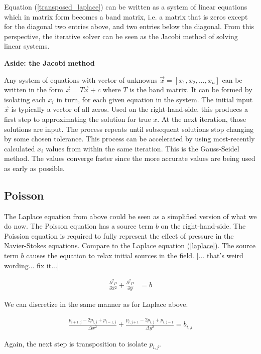 \documentclass[11pt]{article}
\begin{document}
{Equation (\ref{transposed_laplace}) can be written as a system of linear equations which in
matrix form becomes a band matrix, i.e. a matrix that is zeros except for the diagonal
two entries above, and two entries below the diagonal. From this perspective, the iterative
solver can be seen as the Jacobi method of solving linear systems.

\textbf{Aside: the Jacobi method}

Any system of equations with vector of unknowns $\vec{x} = [x_1, x_2,... ,x_n]$ can be written
in the form $\vec{x} = T\vec{x} + c$ where $T$ is the band matrix. It can be formed by
isolating each $x_i$ in turn, for each given equation in the system. The initial input $\vec{x}$
is typically a vector of all zeros. Used on the right-hand-side, this produces a first step
to approximating the solution for true $x$. At the next iteration, those solutions are input.
The process repeats until subsequent solutions stop changing by some chosen tolerance.
This process can be accelerated by using most-recently calculated $x_i$ values from
within the same iteration. This is the Gauss-Seidel method. The values converge faster since
the more accurate values are being used as early as possible.

\subsection{Poisson}
The Laplace equation from above could be seen as a simplified version of what we do now.
The Poisson equation has a source term $b$ on the right-hand-side.
The Poission equation is required to fully represent the effect of pressure in
the Navier-Stokes equations. Compare to the Laplace equation (\ref{laplace}).
The source term $b$ causes the equation to relax initial sources in the field.
[... that's weird wording... fix it...]

\begin{align}
\frac{\partial^2 p}{\partial x^2} + \frac{\partial^2 p}{\partial y} &= b
\label{poisson}
\end{align}

We can discretize in the same manner as for Laplace above.

\begin{align}
\frac{p_{i+1,j} - 2p_{i,j} + p_{i-1,j}}{\Delta x^2}
 + \frac{p_{i,j+1} - 2p_{i,j} + p_{i,j-1}}{\Delta y^2} = b_{i,j}
\label{discrete_poisson}
\end{align}

Again, the next step is transposition to isolate $p_{i,j}$.

}
\end{document}
